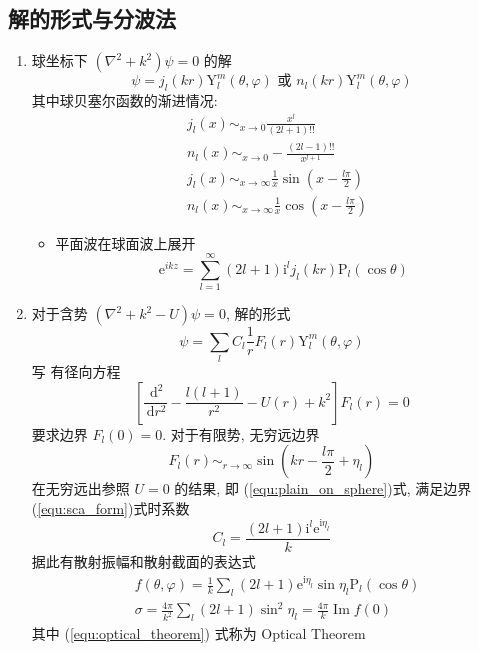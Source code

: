 \documentclass[10pt,a4paper,twocolumn]{article} %
\numberwithin{equation}{section} %
\newcommand{\dif}{\,\mathrm d}
\newcommand\mi{\mathrm{i}}
\newcommand\e{\mathrm{e}} %
\DeclareMathOperator{\Imag}{Im}
\begin{document}
\subsection{解的形式与分波法} %
\label{sub:sol}
\begin{enumerate}
	\item 球坐标下 $(\nabla^2 + k^2)\psi = 0$ 的解
	\begin{equation}
		\psi = j_l(k r)\mathrm Y_l^m(\theta,\varphi) \mbox{~或~}
		n_l(k r)\mathrm Y_l^m(\theta,\varphi)
	\end{equation}
	其中球贝塞尔函数的渐进情况: 
	\begin{align}
		& j_l(x)\mathop{\sim}_{x\to 0} \frac{x^l}{(2l+1)!!}\\
		& n_l(x)\mathop{\sim}_{x\to 0} -\frac{(2l-1)!!}{x^{l+1}}\\
		& j_l(x)\mathop{\sim}_{x\to \infty} \frac 1x
		\sin\left(x-\frac{l\pi}{2}\right)\\
		& n_l(x)\mathop{\sim}_{x\to \infty} \frac 1x
		\cos\left(x-\frac{l\pi}{2}\right)
	\end{align}
	\begin{itemize}
		\item 平面波在球面波上展开
		\begin{equation}\label{equ:plain_on_sphere}
			\e^{ikz} = \sum_{l=1}^\infty (2l+1)\mi^l j_l(kr) 
			\mathrm P_l(\cos\theta)
		\end{equation}
	\end{itemize}
	\item 对于含势 $(\nabla^2 + k^2 - U)\psi = 0$, 解的形式
	\begin{equation}
		\psi = \sum_l C_l \frac 1r F_l(r)\mathrm Y_l^m(\theta, \varphi)
	\end{equation}写
	有径向方程
	\begin{equation}
		\left[\frac{\dif^2}{\dif r^2} - \frac{l(l+1)}{r^2} - U(r) + k^2\right]
		F_l(r) = 0
	\end{equation}
	要求边界 $F_l(0) = 0$. 对于有限势, 无穷远边界
	\begin{equation}\label{equ:radiation_equ}
		F_l(r) \mathop{\sim}_{r\to\infty} 
		\sin\left(kr - \frac{l\pi}{2} + \eta_l\right)
	\end{equation}
	在无穷远出参照 $U=0$ 的结果, 即 (\ref{equ:plain_on_sphere})式, 满足边界
	(\ref{equ:sca_form})式时系数
	\begin{equation}
		C_l = \frac{(2l+1)\mi^l\e^{\mi\eta_l}}{k}
	\end{equation}
	据此有散射振幅和散射截面的表达式
	\begin{align}
		&f(\theta, \varphi) = \frac{1}{k}
		\sum_l (2l+1)\e^{\mi\eta_l}\sin\eta_l\mathrm P_l(\cos\theta) \\
		&\sigma = \frac{4\pi}{k^2}\sum_l (2l+1)\sin^2\eta_l = 
		\frac{4\pi}{k}\Imag f(0)\label{equ:optical_theorem}
	\end{align}
	其中 (\ref{equ:optical_theorem}) 式称为 Optical Theorem
\end{enumerate}
\end{document}
